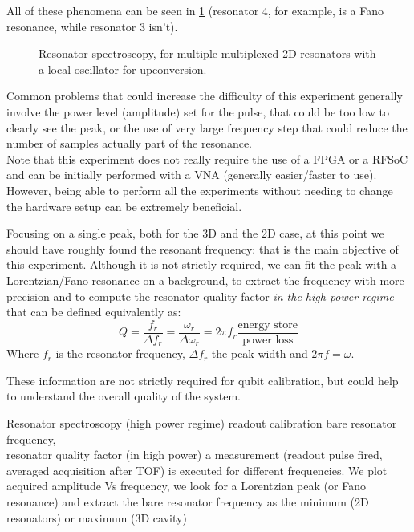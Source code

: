 All of these phenomena can be seen in \cref{fig:resonator_spectroscopy_2D} (resonator 4, for example, is a Fano resonance, while resonator 3 isn't).

\begin{figure}[ht]
    \centering
    \caption{Resonator spectroscopy, for multiple multiplexed 2D resonators with a local oscillator for upconversion.}
    \label{fig:resonator_spectroscopy_2D}
\end{figure}

Common problems that could increase the difficulty of this experiment generally involve the power level (amplitude) set for the pulse, that could be too low to clearly see the peak, or the use of very large frequency step that could reduce the number of samples actually part of the resonance.\\
Note that this experiment does not really require the use of a FPGA or a RFSoC and can be initially performed with a VNA (generally easier/faster to use). 
However, being able to perform all the experiments without needing to change the hardware setup can be extremely beneficial. 

Focusing on a single peak, both for the 3D and the 2D case, at this point we should have roughly found the resonant frequency: that is the main objective of this experiment.
Although it is not strictly required, we can fit the peak with a Lorentzian/Fano resonance on a background, to extract the frequency with more precision and to compute the resonator quality factor \textit{in the high power regime} that can be defined equivalently as:
\begin{equation}
    Q=\frac{f_r}{\Delta f_r}= \frac{\omega_r}{\Delta \omega_r} = 2\pi f_r\frac{\text{energy store}}{\text{power loss}}
\end{equation}
Where $f_r$ is the resonator frequency, $\Delta f_r$ the peak width and $2\pi f = \omega$.

These information are not strictly required for qubit calibration, but could help to understand the overall quality of the system.

\experimentrecap
{Resonator spectroscopy (high power regime)}
{readout calibration}
{bare resonator frequency,\\resonator quality factor (in high power)}
{a measurement (readout pulse fired, averaged acquisition after TOF) is executed for different frequencies. We plot acquired amplitude Vs frequency, we look for a Lorentzian peak (or Fano resonance) and extract the bare resonator frequency as the minimum (2D resonators) or maximum (3D cavity)}
